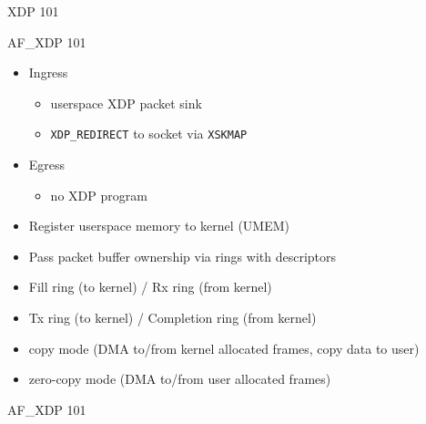 \documentclass[aspectratio=169]{beamer}
\begin{document}
  \begin{frame}{XDP 101}
    \centering{}
  \end{frame}
  \begin{frame}{AF\_XDP 101}
    \begin{itemize}
    \item Ingress
      \begin{itemize}
      \item userspace XDP packet sink
      \item {\tt XDP\_REDIRECT} to socket via {\tt XSKMAP}
      \end{itemize}
    \item Egress
      \begin{itemize}
      \item no XDP program
      \end{itemize}
    \item Register userspace memory to kernel (UMEM)
    \item Pass packet buffer ownership via rings with descriptors
    \item Fill ring (to kernel) / Rx ring (from kernel)
    \item Tx ring (to kernel) / Completion ring (from kernel)
    \item copy mode (DMA to/from kernel allocated frames, copy data to user)
    \item zero-copy mode (DMA to/from user allocated frames)
    \end{itemize}
  \end{frame}
  \begin{frame}{AF\_XDP 101}
    \centering{}
  \end{frame}
\end{document}
